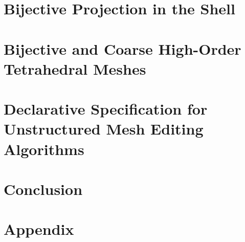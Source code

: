 \documentclass[12pt,oneside,letterpaper, draft]{report}
\begin{document}
% 

\chapter{Bijective Projection in the Shell}
\label{chp-proof}







\chapter{Bijective and Coarse High-Order Tetrahedral Meshes}








\chapter{Declarative Specification for Unstructured Mesh Editing Algorithms }

\chapter{Conclusion}
\label{chp-conclusion}

% 


% 
%
%
%
%



\appendix

\chapter{Appendix}
\end{document}
